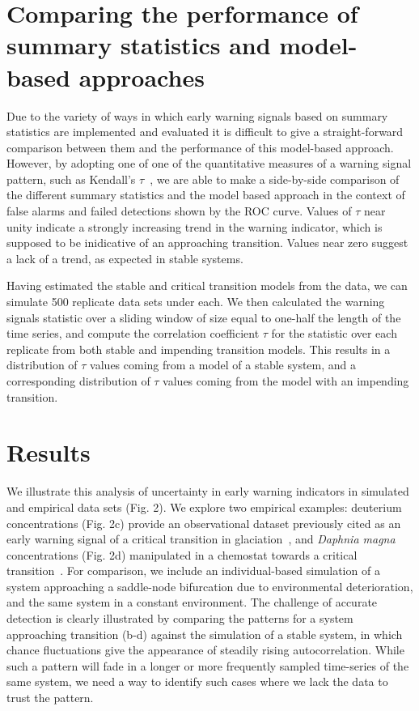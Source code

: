 \documentclass[authoryear,preprint,11pt]{elsarticle}
\begin{document}
\section{Comparing the performance of summary statistics and model-based approaches}  
Due to the variety of ways in which early warning signals based on summary statistics are implemented and evaluated
it is difficult to give a straight-forward comparison between them and the performance of this model-based approach.
However, by adopting one of one of the quantitative measures of a warning signal pattern, such as Kendall's $\tau$~\citep{Dakos2008, Dakos2011, Dakos2009}, 
we are able to make a side-by-side comparison of the different summary statistics and the model based approach in the
context of false alarms and failed detections shown by the ROC curve.  
Values of $\tau$ near unity indicate a strongly increasing trend in the warning indicator, 
which is supposed to be inidicative of an approaching transition.  
Values near zero suggest a lack of a trend, as expected in stable systems.

Having estimated the stable and critical transition models from the data, 
we can simulate 500 replicate data sets under each⁠. 
We then calculated the warning signals statistic over a sliding window of size equal to one-half the length of the time series,
and compute the correlation coefficient $\tau$ for the statistic over each replicate from both stable and impending transition models.  
This results in a distribution of $\tau$ values coming from a model of a stable system, 
and a corresponding distribution of $\tau$ values coming from the model with an impending transition.  

\section{Results}

We illustrate this analysis of uncertainty in early warning indicators in simulated and empirical data sets (Fig. 2). 
We explore two empirical examples:
deuterium concentrations (Fig. 2c) provide an observational dataset
previously cited as an early warning signal of a critical transition in glaciation~\citep{Dakos2008},
and \emph{Daphnia magna} concentrations (Fig. 2d) manipulated in a chemostat towards a critical transition~\citep{Drake2010}.  
For comparison, we include an individual-based simulation of a system approaching a saddle-node bifurcation due to environmental deterioration,
and the same system in a constant environment. 
The challenge of accurate detection is clearly illustrated by comparing the patterns for a system approaching transition (b-d) 
against the simulation of a stable system, in which chance fluctuations give the appearance of steadily rising autocorrelation. 
While such a pattern will fade in a longer or more frequently sampled time-series of the same system, 
we need a way to identify such cases where we lack the data to trust the pattern.  
\end{document}

